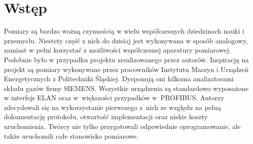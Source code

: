 \section{Wstęp}
Pomiary są bardzo ważną czynnością w wielu współczesnych dziedzinach nauki i przemysłu. Niestety część z nich do dzisiaj jest wykonywana w sposób analogowy, zamiast w pełni korzystać z możliwości współczesnej aparatury pomiarowej. Podobnie było w przypadku projektu zrealizowanego przez autorów. Inspiracją na projekt są pomiary wykonywane przez pracowników Instytutu Maszyn i Urządzeń Energetycznych z Politechniki Śląskiej. Dysponują oni kilkoma analizatorami składu gazów firmy SIEMENS. Wszystkie urządzenia są standardowo wyposażone w interfejs ELAN oraz w~większości przypadków w~PROFIBUS. Autorzy zdecydowali się na wykorzystanie pierwszego z~nich ze względu na pełną dokumentację protokołu, otwartość implementacji oraz niskie koszty uruchomienia. Twórcy nie tylko przygotowali odpowiednie oprogramowanie, ale także uruchomili całe stanowisko pomiarowe.